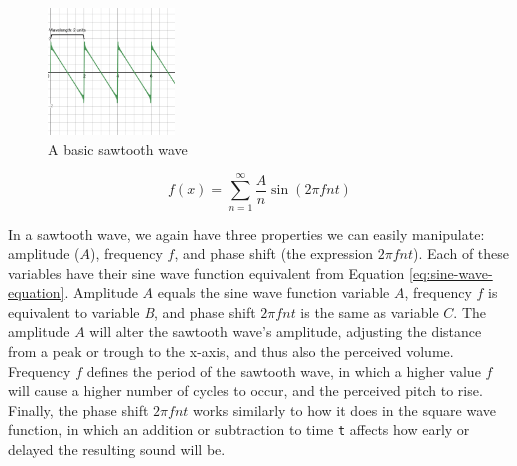 \begin{figure}[ht]
  \centering
  \includegraphics[width=0.3\textwidth]{figures/sawtooth-wave.png}
  \caption{A basic sawtooth wave}
  \label{fig:basic-sawtooth-wave}
\end{figure}

\begin{equation}
	f(x) = \sum_{n=1}^{\infty} \frac{A}{n}\sin(2\pi fnt)
	\label{eq:sawtooth-summation-function}
\end{equation}

In a sawtooth wave, we again have three properties we can easily manipulate: amplitude ($A$), frequency $f$, and phase shift (the expression $2\pi fnt$). Each of these variables have their sine wave function equivalent from Equation \ref{eq:sine-wave-equation}. Amplitude $A$ equals the sine wave function variable $A$, frequency $f$ is equivalent to variable \textit{B}, and phase shift $2\pi fnt$ is the same as variable $C$. The amplitude $A$ will alter the sawtooth wave's amplitude, adjusting the distance from a peak or trough to the x-axis, and thus also the perceived volume. Frequency $f$ defines the period of the sawtooth wave, in which a higher value $f$ will cause a higher number of cycles to occur, and the perceived pitch to rise. Finally, the phase shift $2\pi fnt$ works similarly to how it does in the square wave function, in which an addition or subtraction to time \texttt{t} affects how early or delayed the resulting sound will be.



